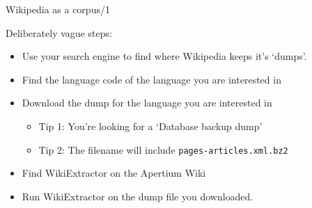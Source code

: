 \documentclass[10pt, compress]{beamer}
\begin{document}
\begin{frame}{Wikipedia as a corpus/1}

Deliberately vague steps:

\begin{itemize}
  \item Use your search engine to find where Wikipedia keeps it's `dumps'.
  \item Find the language code of the language you are interested in
  \item Download the dump for the language you are interested in
  \begin{itemize}
    \item Tip 1: You're looking for a `Database backup dump'
    \item Tip 2: The filename will include {\tt pages-articles.xml.bz2}
  \end{itemize}
  \item Find WikiExtractor on the Apertium Wiki
  \item Run WikiExtractor on the dump file you downloaded. 
\end{itemize}

\end{frame}
\end{document}
